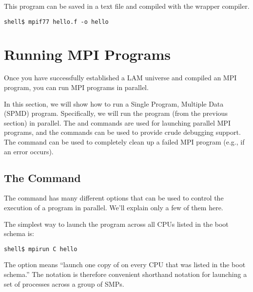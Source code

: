 This program can be saved in a text file and compiled with the
 wrapper compiler.

\lstset{style=lam-cmdline}
\begin{lstlisting}
shell$ mpif77 hello.f -o hello
\end{lstlisting}


\section{Running MPI Programs}

Once you have successfully established a LAM universe and compiled an
MPI program, you can run MPI programs in parallel.

In this section, we will show how to run a Single Program, Multiple
Data (SPMD) program.  Specifically, we will run the 
program (from the previous section) in parallel.  The  and
 commands are used for launching parallel MPI programs,
and the  commands can be used to provide crude debugging
support.  The  command can be used to completely clean
up a failed MPI program (e.g., if an error occurs).


\subsection{The  Command}

The  command has many different options that can be used
to control the execution of a program in parallel.  We'll explain only
a few of them here.

The simplest way to launch the  program across all CPUs
listed in the boot schema is:

\lstset{style=lam-cmdline}
\begin{lstlisting}
shell$ mpirun C hello
\end{lstlisting}

The  option means ``launch one copy of  on
every CPU that was listed in the boot schema.''  The 
notation is therefore convenient shorthand notation for launching a
set of processes across a group of SMPs.

